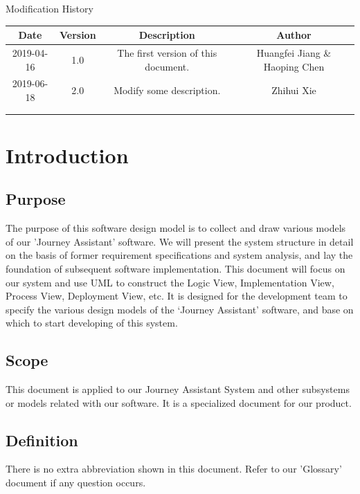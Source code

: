 \documentclass[10pt]{article}
\begin{document}
\newpage

\begin{center}
    {\LARGE Modification History}
    
    \begin{tabular}{|c|c|c|c|} 
        \hline 
        Date&Version&Description&Author\\
        \hline  
        2019-04-16&1.0&The first version of this document.&Huangfei Jiang \& Haoping Chen\\
		\hline 
        2019-06-18&2.0&Modify some description.&Zhihui Xie\\
		\hline
		& & & \\
		\hline
		& & & \\
		\hline
    \end{tabular}    
\end{center}

\newpage

\tableofcontents
\newpage

\section{Introduction}
\subsection{Purpose}
The purpose of this software design model is to collect and draw various models of our 'Journey Assistant' software. We will present the system structure in detail on the basis of former requirement specifications and system analysis, and lay the foundation of subsequent software implementation. This document will focus on our system and use UML to construct the Logic View, Implementation View, Process View, Deployment View, etc. It is designed for the development team to specify the various design models of the ‘Journey Assistant’ software, and base on which to start developing of this system.

\subsection{Scope}
This document is applied to our Journey Assistant System and other subsystems or models related with our software. It is a specialized document for our product.

\subsection{Definition}
There is no extra abbreviation shown in this document. Refer to our 'Glossary' document if any question occurs.
\end{document}
